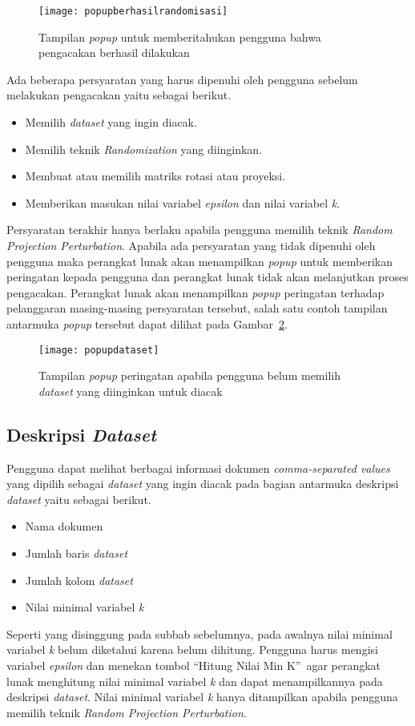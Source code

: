 \begin{figure}
	\centering
	\texttt{[image: popupberhasilrandomisasi]}
	\caption{Tampilan \textit{popup} untuk memberitahukan pengguna bahwa pengacakan berhasil dilakukan}
	\label{fig:popupberhasilrandomisasi}
\end{figure}

Ada beberapa persyaratan yang harus dipenuhi oleh pengguna sebelum melakukan pengacakan yaitu sebagai berikut.
\begin{itemize}
	\item Memilih \textit{dataset} yang ingin diacak.
	\item Memilih teknik \textit{Randomization} yang diinginkan.
	\item Membuat atau memilih matriks rotasi atau proyeksi.
	\item Memberikan masukan nilai variabel \textit{epsilon} dan nilai variabel \textit{k}.
\end{itemize}
Persyaratan terakhir hanya berlaku apabila pengguna memilih teknik \textit{Random Projection Perturbation}. Apabila ada persyaratan yang tidak dipenuhi oleh pengguna maka perangkat lunak akan menampilkan \textit{popup} untuk memberikan peringatan kepada pengguna dan perangkat lunak tidak akan melanjutkan proses pengacakan. Perangkat lunak akan menampilkan \textit{popup} peringatan terhadap pelanggaran masing-masing persyaratan tersebut, salah satu contoh tampilan antarmuka \textit{popup} tersebut dapat dilihat pada Gambar~\ref{fig:popupdataset}.

\begin{figure}
	\centering
	\texttt{[image: popupdataset]}
	\caption{Tampilan \textit{popup} peringatan apabila pengguna belum memilih \textit{dataset} yang diinginkan untuk diacak}
	\label{fig:popupdataset}
\end{figure}

\subsection{Deskripsi \textit{Dataset}}
\label{subsec:deskripsidataset}

Pengguna dapat melihat berbagai informasi dokumen \textit{comma-separated values} yang dipilih sebagai \textit{dataset} yang ingin diacak pada bagian antarmuka deskripsi \textit{dataset} yaitu sebagai berikut. 
\begin{itemize}
	\item Nama dokumen
	\item Jumlah baris \textit{dataset}
	\item Jumlah kolom \textit{dataset}
	\item Nilai minimal variabel \textit{k}
\end{itemize}
Seperti yang disinggung pada subbab sebelumnya, pada awalnya nilai minimal variabel \textit{k} belum diketahui karena belum dihitung. Pengguna harus mengisi variabel \textit{epsilon} dan menekan tombol \textquotedblleft Hitung Nilai Min K\textquotedblright~agar perangkat lunak menghitung nilai minimal variabel \textit{k} dan dapat menampilkannya pada deskripsi \textit{dataset}. Nilai minimal variabel \textit{k} hanya ditampilkan apabila pengguna memilih teknik \textit{Random Projection Perturbation}.

